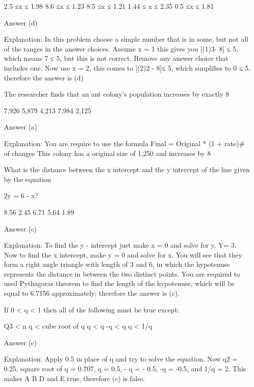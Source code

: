         2.5 ≤x ≤ 1.98
        8.6  ≤x ≤ 1.23
        8.5 ≤x ≤ 1.21
        1.44 ≤ x ≤ 2.35
        0.5 ≤x ≤ 1.81 

    Answer (d)

    Explanation: In this problem choose a simple number that is in some, but not all of the ranges in the answer choices. Assume x = 1 this gives you [(1)3- 8] ≤ 5, which means 7 ≤ 5, but this is not correct. Remove any answer choice that includes one. Now use x = 2, this comes to [(2)2 - 8]≤ 5, which simplifies to 0 ≤ 5, therefore the answer is (d)

    The researcher finds that an ant colony's population increases by exactly 8%

        7,926
        5,879
        4,213
        7,984
        2,125 

    Answer (a)

    Explanation: You are require to use the formula Final = Original * (1 + rate)# of changes This colony has a original size of 1,250 and increases by 8%

    What is the distance between the x intercept and the y intercept of the line given by the equation

    2y = 6 - x?

        8.56
        2.45
        6.71
        5.64
        1.89 

    Answer (c)

    Explanation: To find the y - intercept just make x = 0 and solve for y. Y= 3. Now to find the x intercept, make y = 0 and solve for x. You will see that they form a right angle triangle with length of 3 and 6, in which the hypotenuse represents the distance in between the  two distinct points. You are required to used Pythagoras theorem to find the length of the hypotenuse, which will be equal to 6.7156 approximately; therefore the answer is (c).

    If 0 < q < 1 then all of the following must be true except:

        Q3 < n
        q < cube root of q
        q < q
        -q < q
        q < 1/q 

    Answer (c)

    Explanation: Apply 0.5 in place of q and try to solve the equation. Now q2 = 0.25, square root of q = 0.707, q = 0.5, - q = - 0.5, -q = -0.5, and 1/q = 2. This makes A B D and E true, therefore (c) is false.

